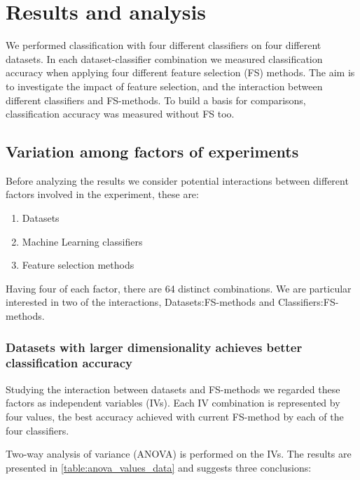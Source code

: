 \chapter{Results and analysis}

We performed classification with four different classifiers on four different datasets. In each dataset-classifier combination we measured classification accuracy when applying four different feature selection (FS) methods. The aim is to investigate the impact of feature selection, and the interaction between different classifiers and FS-methods. To build a basis for comparisons, classification accuracy was measured without FS too.

\section{Variation among factors of experiments}
\label{Variation_among_factors}

Before analyzing the results we consider potential interactions between different factors involved in the experiment, these are:

\begin{enumerate}
  \item Datasets
  \item Machine Learning classifiers
  \item Feature selection methods
\end{enumerate}

Having four of each factor, there are 64 distinct combinations. We are particular interested in two of the interactions, Datasets:FS-methods and Classifiers:FS-methods.

\subsection{Datasets with larger dimensionality achieves better classification accuracy}

Studying the interaction between datasets and FS-methods we regarded these factors as independent variables (IVs). Each IV combination is represented by four values, the best accuracy achieved with current FS-method by each of the four classifiers.

Two-way analysis of variance (ANOVA) is performed on the IVs. The results are presented in \ref{table:anova_values_data} and suggests three conclusions:




